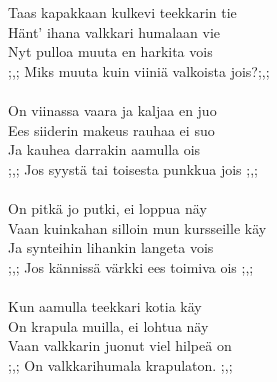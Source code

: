 
Taas kapakkaan kulkevi teekkarin tie \\ Hänt' ihana valkkari humalaan vie \\ Nyt pulloa muuta en harkita vois \\ ;,; Miks muuta kuin viiniä valkoista jois?;,; \\ \hspace{10mm} \\ On viinassa vaara ja kaljaa en juo \\ Ees siiderin makeus rauhaa ei suo \\ Ja kauhea darrakin aamulla ois \\ ;,; Jos syystä tai toisesta punkkua jois ;,; \\ \hspace{10mm} \\ On pitkä jo putki, ei loppua näy \\ Vaan kuinkahan silloin mun kursseille käy \\ Ja synteihin lihankin langeta vois \\ ;,; Jos kännissä värkki ees toimiva ois ;,; \\ \hspace{10mm} \\ Kun aamulla teekkari kotia käy \\ On krapula muilla, ei lohtua näy \\ Vaan valkkarin juonut viel hilpeä on \\ ;,; On valkkarihumala krapulaton. ;,;